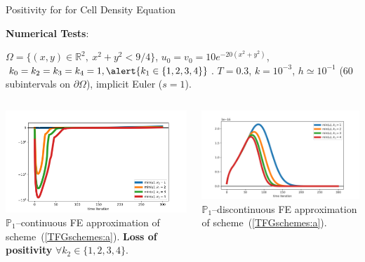\documentclass[final]{beamer}
\newlength{\onecolwid}
\begin{document}
\begin{frame}[t]
\begin{columns}[t]
\begin{column}{\onecolwid}
\begin{block}{Positivity for for Cell Density Equation}
        \bigskip\par
        \textbf{Numerical Tests}:
        \begin{small}
          $\Omega=\{(x,y)\in \mathbb{R}^2,\ x^2+y^2< 9/4\}$,
          $u_0=v_0=10 e^{-20( x^2 + y^2 ) }$,
          $k_0=k_2=k_3=k_4=1, \alert{k_1\in\{1,2,3,4\}}$. $T=0.3$, $k=10^{-3}$,
          $h\simeq 10^{-1}$ ($60$ subintervals on $\partial\Omega$),
          implicit Euler ($s=1$).
          \begin{columns}
            \includegraphics[width=\textwidth]{negative_min_u_k1=1,2,3,4.png}
            \alert{$\mathbb{P}_1$--continuous} FE approximation of
            scheme~(\ref{TFGschemes:a}). \textbf{Loss of positivity}
            $\forall k_2\in\{1,2,3,4\}$.

            \includegraphics[width=\textwidth]{positive_min_u_k1=1,2,3,4.png}
            \alert{$\mathbb{P}_1$--discontinuous} FE approximation of
            scheme~(\ref{TFGschemes:a}). 
          \end{columns}
        \end{small}
      \end{block}



\end{column}
\end{columns}
\end{frame}
\end{document}
